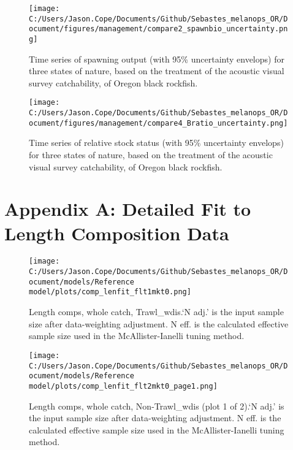 \documentclass[11pt,
  english,
  letterpaper,
]{article}
\begin{document}
\newpage

\begin{figure}
\centering
\texttt{[image: C:/Users/Jason.Cope/Documents/Github/Sebastes\_melanops\_OR/Document/figures/management/compare2\_spawnbio\_uncertainty.png]}
\caption{Time series of spawning output (with 95\% uncertainty envelops) for three states of nature, based on the treatment of the acoustic visual survey catchability, of Oregon black rockfish.\label{fig:stateofnature_SO}}
\end{figure}

\begin{figure}
\centering
\texttt{[image: C:/Users/Jason.Cope/Documents/Github/Sebastes\_melanops\_OR/Document/figures/management/compare4\_Bratio\_uncertainty.png]}
\caption{Time series of relative stock status (with 95\% uncertainty envelops) for three states of nature, based on the treatment of the acoustic visual survey catchability, of Oregon black rockfish.\label{fig:stateofnature_depl}}
\end{figure}

\newpage

\clearpage

\hypertarget{app-a}{%
\section{Appendix A: Detailed Fit to Length Composition Data}\label{app-a}}

\begin{figure}
\centering
\texttt{[image: C:/Users/Jason.Cope/Documents/Github/Sebastes\_melanops\_OR/Document/models/Reference model/plots/comp\_lenfit\_flt1mkt0.png]}
\caption{Length comps, whole catch, Trawl\_wdis.`N adj.' is the input sample size after data-weighting adjustment. N eff. is the calculated effective sample size used in the McAllister-Ianelli tuning method.\label{fig:comp_lenfit_flt1mkt0}}
\end{figure}

\begin{figure}
\centering
\texttt{[image: C:/Users/Jason.Cope/Documents/Github/Sebastes\_melanops\_OR/Document/models/Reference model/plots/comp\_lenfit\_flt2mkt0\_page1.png]}
\caption{Length comps, whole catch, Non-Trawl\_wdis (plot 1 of 2).`N adj.' is the input sample size after data-weighting adjustment. N eff. is the calculated effective sample size used in the McAllister-Ianelli tuning method.\label{fig:comp_lenfit_flt2mkt0_page1}}
\end{figure}
\end{document}
